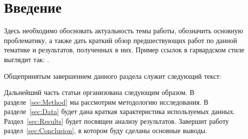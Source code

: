 \section{Введение}
\label{sec:Intro}

Здесь необходимо обосновать актуальность темы работы, обозначить основную проблематику, а также дать краткий обзор предшествующих работ по данной тематике и результатов, полученных в них. Пример ссылок в гарвардском стиле выглядит так: \citet{bib:AuthorYear}.

Общепринятым завершением данного раздела служит следующий текст:

Дальнейший часть статьи организована следующим образом. В разделе~\ref{sec:Method} мы рассмотрим методологию исследования. В разделе~\ref{sec:Data} будет дана краткая характеристика используемых данных. Раздел~\ref{sec:Results} будет посвящен анализу результатов. Завершит работу раздел~\ref{sec:Conclusion}, в котором буду сделаны основные выводы.